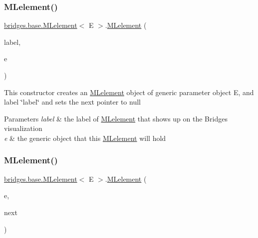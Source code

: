 \subsubsection{\texorpdfstring{MLelement()}{MLelement()}\hspace{0.1cm}{\footnotesize\ttfamily [2/4]}}
{\footnotesize\ttfamily \mbox{\hyperlink{classbridges_1_1base_1_1_m_lelement}{bridges.\+base.\+M\+Lelement}}$<$ E $>$.\mbox{\hyperlink{classbridges_1_1base_1_1_m_lelement}{M\+Lelement}} (\begin{DoxyParamCaption}\item[{String}]{label,  }\item[{E}]{e }\end{DoxyParamCaption})}

This constructor creates an \mbox{\hyperlink{classbridges_1_1base_1_1_m_lelement}{M\+Lelement}} object of generic parameter object E, and label \char`\"{}label\char`\"{} and sets the next pointer to null


\begin{DoxyParams}{Parameters}
{\em label} & the label of \mbox{\hyperlink{classbridges_1_1base_1_1_m_lelement}{M\+Lelement}} that shows up on the Bridges visualization \\
\hline
{\em e} & the generic object that this \mbox{\hyperlink{classbridges_1_1base_1_1_m_lelement}{M\+Lelement}} will hold \\
\hline
\end{DoxyParams}
\mbox{\label{classbridges_1_1base_1_1_m_lelement_ad3d5fe59028cd6854eb2abceefad7f7d}} 
\subsubsection{\texorpdfstring{MLelement()}{MLelement()}\hspace{0.1cm}{\footnotesize\ttfamily [3/4]}}
{\footnotesize\ttfamily \mbox{\hyperlink{classbridges_1_1base_1_1_m_lelement}{bridges.\+base.\+M\+Lelement}}$<$ E $>$.\mbox{\hyperlink{classbridges_1_1base_1_1_m_lelement}{M\+Lelement}} (\begin{DoxyParamCaption}\item[{E}]{e,  }\item[{\mbox{\hyperlink{classbridges_1_1base_1_1_m_lelement}{M\+Lelement}}$<$ E $>$}]{next }\end{DoxyParamCaption})}

